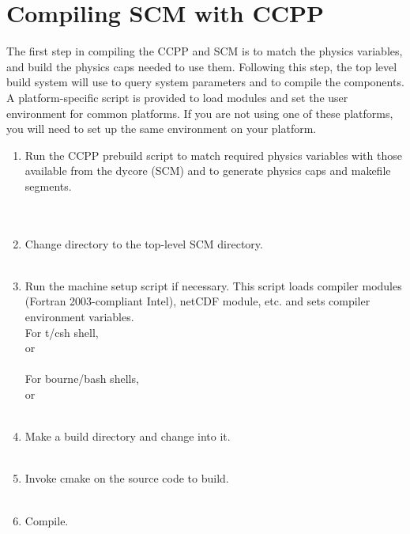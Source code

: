 \section{Compiling SCM with CCPP}

The first step in compiling the CCPP and SCM is to match the physics variables, and build the physics caps needed to use them.  Following this step, the top level build system will use  to query system parameters and  to compile the components.  A platform-specific script is provided to load modules and set the user environment for common platforms.  If you are not using one of these platforms, you will need to set up the same environment on your platform.

\begin{enumerate}
	\item Run the CCPP prebuild script to match required physics variables with those available from the dycore (SCM) and to generate physics caps and makefile segments.\\
   \\
  \\

	\item Change directory to the top-level SCM directory.\\
   \\
	\item Run the machine setup script if necessary. This script loads compiler modules (Fortran 2003-compliant Intel), netCDF module, etc. and sets compiler environment variables.  \\
For t/csh shell, \\
   or\\
  \\

For bourne/bash shells,\\
   or\\
  \\

	\item Make a build directory and change into it.  \\
  \\

	\item Invoke cmake on the source code to build.  \\
  \\
	\item Compile.  \\
  \\

\end{enumerate}

